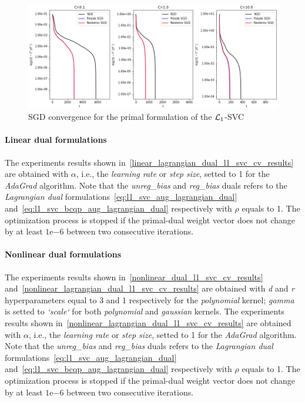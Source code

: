 \begin{figure}[H]
	\centering
	\includegraphics[scale=0.55]{img/l1_svc_loss_history}
	\caption{SGD convergence for the primal formulation of the $\protect \mathcal{L}_1$-SVC}
	\label{fig:l1_svc_loss_history}
\end{figure}

\paragraph{Linear dual formulations}

The experiments results shown in~\ref{linear_lagrangian_dual_l1_svc_cv_results} are obtained with $\alpha$, i.e., the \emph{learning rate} or \emph{step size}, setted to 1 for the \emph{AdaGrad} algorithm. Note that the \emph{unreg\_bias} and \emph{reg\_bias} duals refers to the \emph{Lagrangian dual} formulations~\eqref{eq:l1_svc_aug_lagrangian_dual} and~\eqref{eq:l1_svc_bcqp_aug_lagrangian_dual} respectively with $\rho$ equals to 1. The optimization process is stopped if the primal-dual weight vector does not change by at least $1\mathrm{e}{-6}$  between two consecutive iterations.





\paragraph{Nonlinear dual formulations}

The experiments results shown in~\ref{nonlinear_dual_l1_svc_cv_results} and~\ref{nonlinear_lagrangian_dual_l1_svc_cv_results} are obtained with \emph{d} and \emph{r} hyperparameters equal to 3 and 1 respectively for the \emph{polynomial} kernel; \emph{gamma} is setted to \emph{`scale`} for both \emph{polynomial} and \emph{gaussian} kernels. The experiments results shown in~\ref{nonlinear_lagrangian_dual_l1_svc_cv_results} are obtained with $\alpha$, i.e., the \emph{learning rate} or \emph{step size}, setted to 1 for the \emph{AdaGrad} algorithm. Note that the \emph{unreg\_bias} and \emph{reg\_bias} duals refers to the \emph{Lagrangian dual} formulations~\eqref{eq:l1_svc_aug_lagrangian_dual} and~\eqref{eq:l1_svc_bcqp_aug_lagrangian_dual} respectively with $\rho$ equals to 1. The optimization process is stopped if the primal-dual weight vector does not change by at least $1\mathrm{e}{-6}$  between two consecutive iterations.

